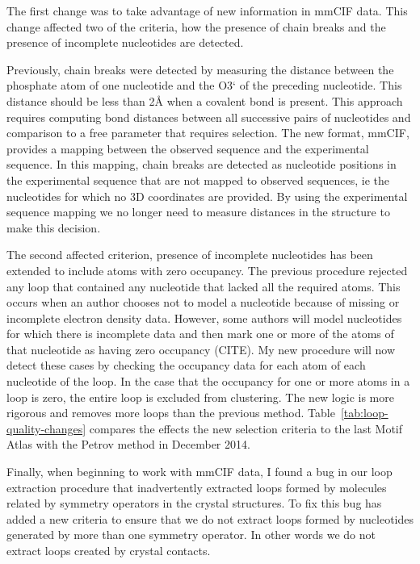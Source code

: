 The first change was to take advantage of new information in mmCIF data. This
change affected two of the criteria, how the presence of chain breaks and
the presence of incomplete nucleotides are detected.

Previously, chain breaks were detected by measuring the distance between the
phosphate atom of one nucleotide and the O3` of the preceding nucleotide. This
distance should be less than 2{\AA} \cite{Petrov2012} when a covalent bond is
present. This approach requires computing bond distances between all successive
pairs of nucleotides and comparison to a free parameter that requires selection.
The new format, mmCIF, provides a mapping between the observed sequence and the
experimental sequence. In this mapping, chain breaks are detected as nucleotide
positions in the experimental sequence that are not mapped to observed
sequences, ie the nucleotides for which no 3D coordinates are provided. By
using the experimental sequence mapping we no longer need to measure distances
in the structure to make this decision.

The second affected criterion, presence of incomplete nucleotides has been
extended to include atoms with zero occupancy. The previous procedure rejected
any loop that contained any nucleotide that lacked all the required atoms. This
occurs when an author chooses not to model a nucleotide because of missing  or
incomplete electron density data. However, some authors will model nucleotides
for which there is incomplete data and then mark one or more of the atoms of
that nucleotide as having zero occupancy (CITE). My new procedure will now
detect these cases by checking the occupancy data for each atom of each
nucleotide of the loop. In the case that the occupancy for one or more atoms in
a loop is zero, the entire loop is excluded from clustering. The new logic is
more rigorous and removes more loops than the previous method.
Table~\ref{tab:loop-quality-changes} compares the effects the new selection
criteria to the last Motif Atlas with the Petrov method in December 2014.

Finally, when beginning to work with mmCIF data, I found a bug in our loop
extraction procedure that inadvertently extracted loops formed by molecules
related by symmetry operators in the crystal structures. To fix this bug has
added a new criteria to ensure that we do not extract loops formed by
nucleotides generated by more than one symmetry operator.  In other words
we do not extract loops created by crystal contacts.

